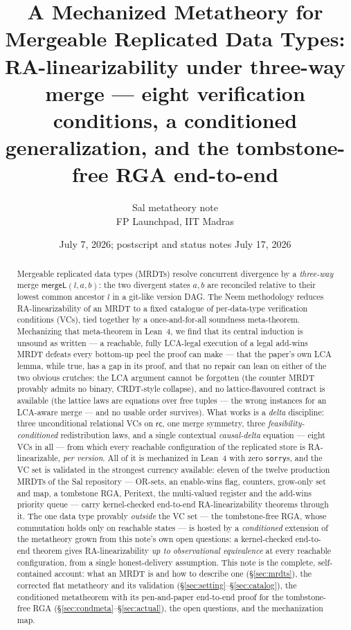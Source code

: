 \documentclass[11pt]{article}
\title{\bfseries A Mechanized Metatheory for Mergeable Replicated Data Types:\\
\large RA-linearizability under three-way merge --- eight verification
conditions, a conditioned generalization, and the tombstone-free RGA
end-to-end}
\author{Sal metatheory note\\ \small FP Launchpad, IIT Madras}
\date{July 7, 2026; postscript and status notes July 17, 2026}
\newcommand{\mergeL}{\mathsf{mergeL}}
\newcommand{\lean}[1]{\texttt{#1}}
\begin{document}
\maketitle

\begin{abstract}
\noindent
Mergeable replicated data types (MRDTs) resolve concurrent divergence by a
\emph{three-way} merge $\mergeL(l,a,b)$: the two divergent states $a,b$
are reconciled relative to their lowest common ancestor $l$ in a git-like
version DAG. The Neem methodology reduces RA-linearizability of an MRDT to
a fixed catalogue of per-data-type verification conditions (VCs), tied
together by a once-and-for-all soundness meta-theorem. Mechanizing that
meta-theorem in Lean~4, we find that its central induction is unsound as
written --- a reachable, fully LCA-legal execution of a legal add-wins
MRDT defeats every bottom-up peel the proof can make --- that the paper's
own LCA lemma, while true, has a gap in its proof, and that no repair can
lean on either of the two obvious crutches: the LCA argument cannot be
forgotten (the counter MRDT provably admits no binary, CRDT-style
collapse), and no lattice-flavoured contract is available (the lattice
laws are equations over free tuples --- the wrong instances for an
LCA-aware merge --- and no usable order survives). What works
is a \emph{delta} discipline: three unconditional relational VCs on
$\mathsf{rc}$, one merge symmetry, three \emph{feasibility-conditioned}
redistribution laws, and a single contextual \emph{causal-delta} equation
--- eight VCs in all --- from which every reachable configuration of the
replicated store is RA-linearizable, \emph{per version}. All of it is
mechanized in Lean~4 with zero \lean{sorry}s, and the VC set is validated
in the strongest currency available: eleven of the twelve production MRDTs
of the Sal repository --- OR-sets, an enable-wins flag, counters, grow-only
set and map, a tombstone RGA, Peritext, the multi-valued register and the
add-wins priority queue --- carry kernel-checked end-to-end
RA-linearizability theorems through it. The one data type
provably \emph{outside} the VC set --- the tombstone-free RGA, whose
commutation holds only on reachable states --- is hosted by a
\emph{conditioned} extension of the metatheory grown from this note's own
open questions: a kernel-checked end-to-end theorem gives
RA-linearizability \emph{up to observational equivalence} at every
reachable configuration, from a single honest-delivery assumption. This
note is the complete, self-contained account: what an MRDT is and how to
describe one (\S\ref{sec:mrdts}), the corrected flat metatheory and its
validation (\S\ref{sec:setting}--\S\ref{sec:catalog}), the conditioned
metatheorem with its pen-and-paper end-to-end proof for the tombstone-free
RGA (\S\ref{sec:condmeta}--\S\ref{sec:actual}), the open questions, and
the mechanization map.
\end{abstract}
\end{document}
